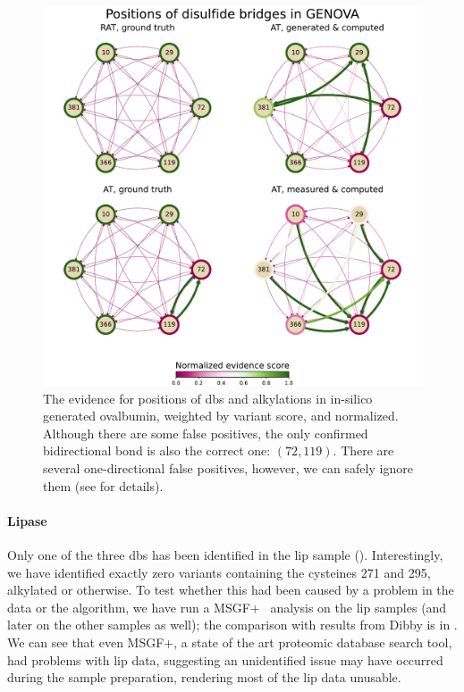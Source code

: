 \begin{figure}
  \centering
  \includegraphics[width=0.9\linewidth]{img/pdfa-genova.pdf}
  \caption{The evidence for positions of \glspl*{db} and alkylations in in-silico generated ovalbumin, weighted by variant score, and normalized. Although there are some false positives, the only confirmed bidirectional bond is also the correct one: \((72, 119)\). There are several one-directional false positives, however, we can safely ignore them (see  for details).}\label{fig:genova}
\end{figure}

\paragraph{Lipase} Only one of the three \glspl*{db} has been identified in the \gls*{lip} sample (). Interestingly, we have identified exactly zero variants containing the cysteines 271 and 295, alkylated or otherwise. To test whether this had been caused by a problem in the data or the algorithm, we have run a MSGF+~\cite{kim2014ms} analysis on the \gls*{lip} samples (and later on the other samples as well); the comparison with results from Dibby is in . We can see that even MSGF+, a state of the art proteomic database search tool, had problems with \gls*{lip} data, suggesting an unidentified issue may have occurred during the sample preparation, rendering most of the \gls*{lip} data unusable.

